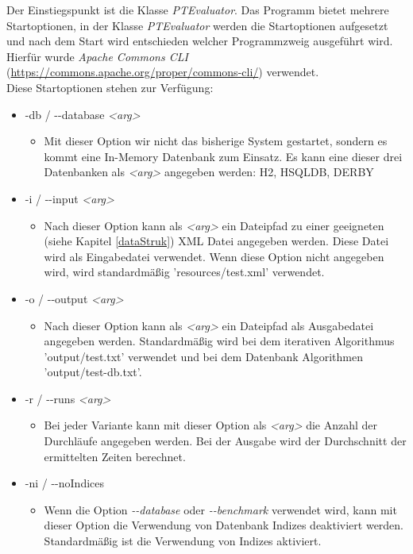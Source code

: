 \documentclass[draft,final]{vutinfth} %
\begin{document}
Der Einstiegspunkt ist die Klasse \textit{PTEvaluator}. Das Programm bietet mehrere Startoptionen, in der Klasse \textit{PTEvaluator} werden die Startoptionen aufgesetzt und nach dem Start wird entschieden welcher Programmzweig ausgeführt wird. Hierfür wurde \textit{Apache Commons CLI} (\url{https://commons.apache.org/proper/commons-cli/}) verwendet. \\
Diese Startoptionen stehen zur Verfügung:
\begin{itemize}
	\item -db / -{}-database \textit{<arg>}
	\begin{itemize}
		\item Mit dieser Option wir nicht das bisherige System gestartet, sondern es kommt eine In-Memory Datenbank zum Einsatz. Es kann eine dieser drei Datenbanken als \textit{<arg>} angegeben werden: H2, HSQLDB, DERBY
	\end{itemize}
	\item -i / -{}-input \textit{<arg>}
	\begin{itemize}
		\item Nach dieser Option kann als \textit{<arg>} ein Dateipfad zu einer geeigneten (siehe Kapitel \ref{dataStruk}) XML Datei angegeben werden. Diese Datei wird als Eingabedatei verwendet. Wenn diese Option nicht angegeben wird, wird standardmä\ss ig 'resources/test.xml' verwendet.
	\end{itemize}
	\item -o / -{}-output \textit{<arg>}
	\begin{itemize}
		\item Nach dieser Option kann als \textit{<arg>} ein Dateipfad als Ausgabedatei angegeben werden. Standardmä\ss ig wird bei dem iterativen Algorithmus 'output/test.txt' verwendet und bei dem Datenbank Algorithmen 'output/test-db.txt'.
	\end{itemize}
	\item -r / -{}-runs \textit{<arg>}
	\begin{itemize}
		\item Bei jeder Variante kann mit dieser Option als \textit{<arg>} die Anzahl der Durchläufe angegeben werden. Bei der Ausgabe wird der Durchschnitt der ermittelten Zeiten berechnet. 
	\end{itemize}
	\item -ni / -{}-noIndices
	\begin{itemize}
		\item Wenn die Option \textit{-{}-database} oder \textit{-{}-benchmark} verwendet wird, kann mit dieser Option die Verwendung von Datenbank Indizes deaktiviert werden. Standardmä\ss ig ist die Verwendung von Indizes aktiviert.

\end{itemize}
\end{itemize}
\end{document}
